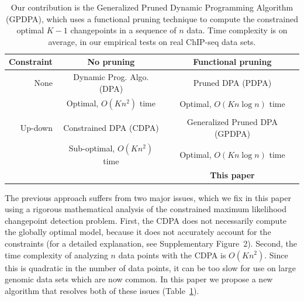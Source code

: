 \documentclass[twoside,11pt]{article}
\begin{document}

\begin{table}[t!]
  \centering
  \begin{tabular}{r|c|c}
    Constraint & No pruning & Functional pruning \\
    \hline
    None & Dynamic Prog. Algo. (DPA) & Pruned DPA (PDPA) \\
    & Optimal, $O(Kn^2)$ time & Optimal, $O(Kn\log n)$ time\\
    & \citet{segment-neighborhood}     & \citet{pruned-dp, phd-johnson} \\
    \hline
    Up-down & Constrained DPA (CDPA) & Generalized Pruned DPA (GPDPA) \\
    & Sub-optimal, $O(Kn^2)$ time & Optimal, $O(Kn\log n)$ time\\
    & \citet{HOCKING-PeakSeg} & \textbf{This paper} \\
    \hline
  \end{tabular}
  \caption{Our contribution is 
the Generalized Pruned Dynamic Programming Algorithm (GPDPA), 
 which uses a functional pruning technique 
    to compute the constrained optimal $K-1$ changepoints 
in a sequence of $n$ data. 
Time complexity is on average, 
in our empirical tests on real ChIP-seq data sets.}
\label{tab:contribution}
\end{table}

The previous approach suffers from two major issues, which we fix in
this paper using a rigorous mathematical analysis of the constrained
maximum likelihood changepoint detection problem. First, the CDPA does
not necessarily compute the globally optimal model, because it does
not accurately account for the constraints (for a detailed
explanation, see Supplementary Figure~2). Second, the time complexity
of analyzing $n$ data points with the CDPA is $O(Kn^2)$. Since this is quadratic in the number of
data points, it can be too slow for use on large genomic data sets
which are now common. In this paper we propose a new algorithm that
resolves both of these issues (Table~\ref{tab:contribution}).
\end{document}
